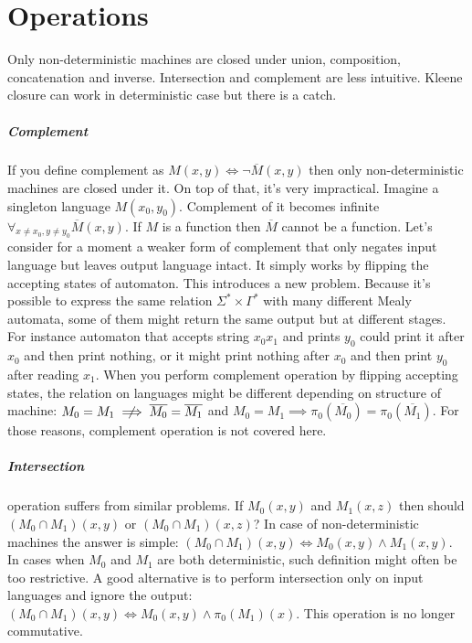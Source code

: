 \documentclass[12pt]{article}
\begin{document}
\section{Operations} Only non-deterministic machines are closed under union, composition, concatenation and inverse. Intersection and complement are less intuitive. Kleene closure can work in deterministic case but there is a catch.
\subparagraph{Complement} If you define complement as $M(x,y) \iff \neg \overline{M}(x,y)$ then only non-deterministic machines are closed under it. On top of that, it's very impractical. Imagine a singleton language $M(x_0,y_0)$. Complement of it becomes infinite $\forall_{x\ne x_0,y\ne y_0} \overline{M}(x,y)$. If $M$ is a function then $\overline{M} $ cannot be a function. Let's consider for a moment a weaker form of complement that only negates input language but leaves output language intact. It simply works by flipping the accepting states of automaton. This introduces a new problem. Because it's possible to express the same relation $\Sigma^* \times \Gamma^*$ with many different Mealy automata, some of them might return the same output but at different stages. For instance automaton that accepts string $x_0x_1$ and prints $y_0$ could print it after $x_0$ and then print nothing, or it might print nothing after $x_0$ and then print $y_0$ after reading $x_1$. When you perform complement operation by flipping accepting states, the relation on languages might be different depending on structure of machine: $M_0 = M_1 \centernot \implies \overline{M_0} = \overline{M_1}$ and $M_0 = M_1  \implies \pi_0(\overline{M_0}) = \pi_0(\overline{M_1})$. For those reasons, complement operation is not covered here.

\subparagraph{Intersection}  operation suffers from similar problems. If $M_0(x,y)$ and $M_1(x,z)$ then should $(M_0 \cap M_1)(x,y)$ or $(M_0 \cap M_1)(x,z)$? In case of non-deterministic machines the answer is simple: $(M_0 \cap M_1)(x,y) \iff M_0(x,y) \wedge M_1(x,y)$. In cases when $M_0$ and $M_1$ are both deterministic, such definition might often be too restrictive. A good alternative is to perform intersection only on input languages and ignore the output: $(M_0 \cap M_1)(x,y) \iff M_0(x,y) \wedge \pi_0(M_1)(x)$. This operation is no longer commutative. 
\end{document}
